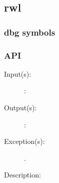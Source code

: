 %
%
%
%
%              

\subsection{rwl}
\label{rwl}

\subsubsection{dbg symbols}

\subsubsection{API}
\begin{description}
\label{rwl_}
\item[{\cfunc[]{rwl\_}{}}: ]
	\begin{description}\item[]
	\item[Input(s): ]
		\begin{description}\item[]
		\item[: ]
		\end{description}
	\item[Output(s): ]
		\begin{description}\item[]
		\item[: ]
		\end{description}
	\item[Exception(s): ]
		\begin{description}\item[]
		\item[.]
		\end{description}
	\item[Description: ]
	\end{description}
\end{description}
